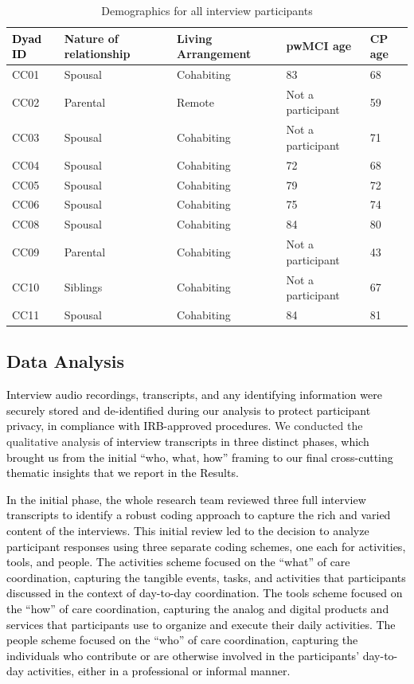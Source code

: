 \documentclass[acmsmall]{acmart}
\begin{document}
\begin{table}
    \centering
        \begin{tabular}{|p{2cm}|p{2.6cm}|p{3cm}|p{3cm}|p{2cm}|}
        \hline
         \textbf{\textcolor{black}{Dyad ID}}&  \textbf{Nature of relationship}& \textbf{Living Arrangement}& \textbf{pwMCI age}& \textbf{CP age}\\ \hline 
         CC01&  Spousal& Cohabiting& 83& 68 \\ \hline 
         CC02&  Parental& Remote& Not a participant& 59 \\ \hline 
         CC03&  Spousal& Cohabiting& Not a participant& 71 \\ \hline 
         CC04& Spousal& Cohabiting& 72& 68 \\ \hline
         CC05& Spousal& Cohabiting& 79& 72 \\ \hline
         CC06& Spousal& Cohabiting& 75& 74 \\ \hline
         CC08& Spousal& Cohabiting& 84& 80 \\ \hline
         CC09& Parental& Cohabiting& Not a participant& 43 \\ \hline
         CC10& Siblings& Cohabiting& Not a participant& 67 \\ \hline
         CC11& Spousal& Cohabiting& 84& 81 \\ \hline
    \end{tabular}
    \caption{Demographics for all interview participants}
\end{table}

\subsection{Data Analysis}

\textcolor{black}{Interview audio recordings, transcripts, and any identifying information were securely stored and de-identified during our analysis to protect participant privacy, in compliance with IRB-approved procedures.} We conducted the qualitative analysis \textcolor{black}{of interview transcripts in three distinct phases, which brought us from the initial “who, what, how” framing to our final cross-cutting thematic insights that we report in the Results.}  

\textcolor{black}{In the initial phase, the whole research team reviewed three full interview transcripts to identify a robust coding approach to capture the rich and varied content  of the interviews. This initial review led to the decision to analyze participant responses using three separate coding schemes, one each for activities, tools, and people. The activities scheme focused on  the “what” of care coordination, capturing  the tangible events, tasks, and activities that participants discussed in the context of day-to-day coordination. The tools scheme focused on  the “how” of care coordination, capturing the analog and digital products and services that participants use to organize and execute their daily activities. The people scheme focused on the “who” of care coordination, capturing the individuals who contribute  or are otherwise involved in the participants’ day-to-day activities, either in a professional or informal manner.}
\end{document}
